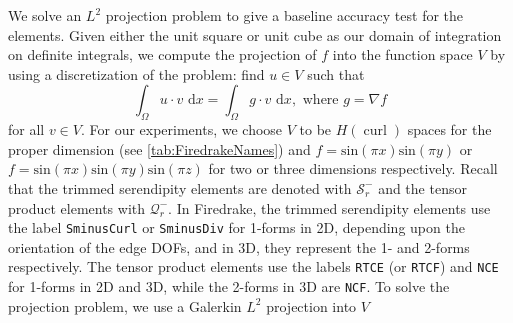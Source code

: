 \documentclass[format=acmsmall,screen,timestamp=false,a4paper]{acmart}
\DeclareMathOperator{\curl}{curl}
\newcommand{\hcurl}{\ensuremath{{H}(\curl)}\xspace}
\begin{document}
We solve an $L^2$ projection problem to give a baseline accuracy test for the elements. Given either the unit square or unit cube as our domain of integration on definite integrals, we compute the projection of $f$ into the function space $V$ by using a discretization of the problem: find $u\in V$ such that
\begin{equation*}
  \int_\Omega u \cdot v \text{ d}x = \int_\Omega g \cdot v \text{ d}x, \text{ where } g = \nabla f
\end{equation*}
for all $v \in V$.  For our experiments, we choose $V$ to be \hcurl spaces for the proper dimension (see \cref{tab:FiredrakeNames}) and $f = \text{sin}(\pi x)\text{sin}(\pi y)$ or $f=\text{sin}(\pi x)\text{sin}(\pi y)\text{sin}(\pi z)$ for two or three dimensions respectively.
Recall that the trimmed serendipity elements are denoted with $\mathcal{S}_r^-$ and the tensor product elements with $\mathcal{Q}^-_r$.  In Firedrake, the trimmed serendipity elements use the label \texttt{SminusCurl} or \texttt{SminusDiv} for 1-forms in 2D, depending upon the orientation of the edge DOFs, and in 3D, they represent the 1- and 2-forms respectively.  The tensor product elements use the labels \texttt{RTCE} (or \texttt{RTCF}) and  \texttt{NCE} for 1-forms in 2D and 3D, while the 2-forms in 3D are  \texttt{NCF}.  To solve the projection problem, we use a Galerkin $L^2$ projection into $V$
\end{document}
